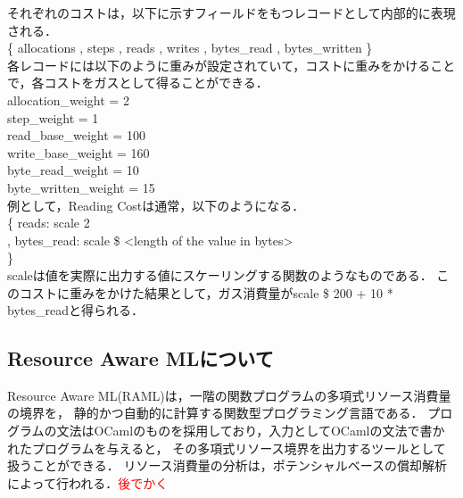 \documentclass{kuisthesis}
\begin{document}
それぞれのコストは，以下に示すフィールドをもつレコードとして内部的に表現される．\\
\hspace{15pt}\{ allocations 
, steps 
, reads 
, writes 
, bytes\_read 
, bytes\_written 
\} \\
各レコードには以下のように重みが設定されていて，コストに重みをかけることで，各コストをガスとして得ることができる．\\
\hspace{15pt} allocation\_weight = 2 \\
\hspace{15pt} step\_weight = 1 \\
\hspace{15pt} read\_base\_weight = 100 \\
\hspace{15pt} write\_base\_weight = 160 \\
\hspace{15pt} byte\_read\_weight = 10 \\
\hspace{15pt} byte\_written\_weight = 15 \\
例として，Reading Costは通常，以下のようになる． \\
\hspace{15pt} \{ reads: scale 2 \\
\hspace{15pt} , bytes\_read: scale \$ <length of the value in bytes> \\
\hspace{15pt} \} \\
scaleは値を実際に出力する値にスケーリングする関数のようなものである．
このコストに重みをかけた結果として，ガス消費量がscale \$ 200 + 10 * bytes\_readと得られる．




\subsection{Resource Aware MLについて}\label{subsec-pre-raml}
Resource Aware ML(RAML)は，一階の関数プログラムの多項式リソース消費量の境界を，
静的かつ自動的に計算する関数型プログラミング言語である．
プログラムの文法はOCamlのものを採用しており，入力としてOCamlの文法で書かれたプログラムを与えると，
その多項式リソース境界を出力するツールとして扱うことができる．
リソース消費量の分析は，ポテンシャルベースの償却解析によって行われる．\textcolor{red}{後でかく}
\end{document}
